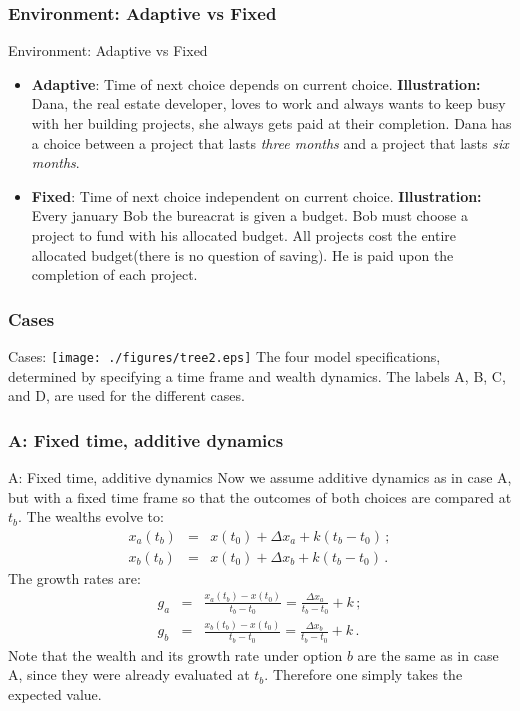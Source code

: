 \documentclass{beamer}
\newcommand{\bea}{\begin{eqnarray}}
\newcommand{\eea}{\end{eqnarray}}
\newcommand{\Dx}{\Delta x}
\numberwithin{equation}{section}
\begin{document}
\subsubsection{Environment: Adaptive vs Fixed}
\begin{frame}{Environment: Adaptive vs Fixed}
\begin{itemize}
    \item \textbf{Adaptive}: Time of next choice depends on current choice. \textbf{Illustration:} Dana, the real estate developer, loves to work and always wants to keep busy with her building projects, she always gets paid at their completion. Dana has a choice between a project that lasts \textit{three months} and a project that lasts \textit{six months}. 
    \item \textbf{Fixed}: Time of next choice independent on current choice. \textbf{Illustration:} Every january Bob the bureacrat is given a budget. Bob must choose a project to fund with his allocated budget. All projects cost the entire allocated budget(there is no question of saving). He is paid upon the completion of each project.
\end{itemize}
\end{frame}

\subsubsection{Cases}
\begin{frame}{Cases:}
\texttt{[image: ./figures/tree2.eps]} \newline
The four model specifications, determined by specifying a time frame and wealth dynamics. The labels A, B, C, and D, are used for the different cases.
\end{frame}



\subsubsection{A: Fixed time, additive dynamics}
\begin{frame}{A: Fixed time, additive dynamics}
Now we assume additive dynamics as in case A, but with a fixed time frame so that the outcomes of both choices are compared at $t_b$. The wealths evolve to: \bea
x_a\left(t_b\right) &=& x\left(t_0\right) + \Dx_a + k(t_b-t_0)\,; \\
x_b\left(t_b\right) &=& x\left(t_0\right) + \Dx_b + k(t_b-t_0)\,.
\eea
The growth rates are:
\bea
g_a &=& \frac{x_a\left(t_b\right) - x\left(t_0\right)}{t_b-t_0} = \frac{\Dx_a}{t_b-t_0} + k\,;\\
g_b &=& \frac{x_b\left(t_b\right) - x\left(t_0\right)}{t_b-t_0} = \frac{\Dx_b}{t_b-t_0} + k\,.
\eea
Note that the wealth and its growth rate under option $b$ are the same as in case A, since they were already evaluated at $t_b$. Therefore one simply takes the expected value. 
\end{frame}
\end{document}
